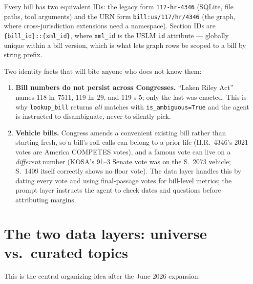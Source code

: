 \documentclass[11pt]{article}
\newcommand{\code}[1]{\texttt{#1}}
\begin{document}
Every bill has two equivalent IDs: the legacy form \code{117-hr-4346}
(SQLite, file paths, tool arguments) and the URN form
\code{bill:us/117/hr/4346} (the graph, where cross-jurisdiction extensions
need a namespace). Section IDs are
\code{\{bill\_id\}::\{xml\_id\}}, where \code{xml\_id} is the USLM
\code{id} attribute --- globally unique within a bill version, which is what
lets graph rows be scoped to a bill by string prefix.

Two identity facts that will bite anyone who does not know them:

\begin{enumerate}[itemsep=2pt]
  \item \textbf{Bill numbers do not persist across Congresses.} ``Laken Riley
        Act'' names 118-hr-7511, 119-hr-29, and 119-s-5; only the last was
        enacted. This is why \code{lookup\_bill} returns \emph{all} matches
        with \code{is\_ambiguous=True} and the agent is instructed to
        disambiguate, never to silently pick.
  \item \textbf{Vehicle bills.} Congress amends a convenient existing bill
        rather than starting fresh, so a bill's roll calls can belong to a
        prior life (H.R.~4346's 2021 votes are America COMPETES votes), and a
        famous vote can live on a \emph{different} number (KOSA's 91--3
        Senate vote was on the S.~2073 vehicle; S.~1409 itself correctly
        shows no floor vote). The data layer handles this by dating every
        vote and using final-passage votes for bill-level metrics; the
        prompt layer instructs the agent to check dates and questions before
        attributing margins.
\end{enumerate}

\section{The two data layers: universe vs.\ curated topics}
\label{sec:twolayers}

This is the central organizing idea after the June 2026 expansion:
\end{document}
